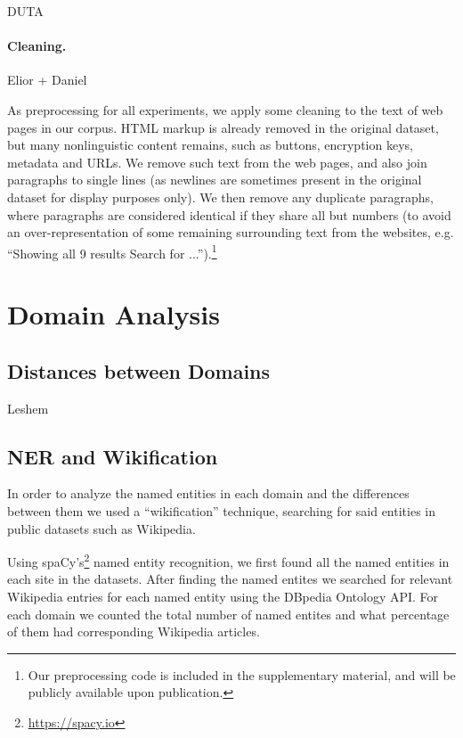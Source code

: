 \documentclass[11pt,a4paper]{article}
\begin{document}
DUTA \citep{AlNabki17}

\paragraph{Cleaning.} Elior + Daniel

As preprocessing for all experiments, we apply some cleaning to the text
of web pages in our corpus.
HTML markup is already removed in the original dataset,
but many nonlinguistic content remains, such as
buttons, encryption keys, metadata and URLs.
We remove such text from the web pages, and also join paragraphs to single lines
(as newlines are sometimes present in the original dataset for display purposes
only).
We then remove any duplicate paragraphs, where paragraphs are considered
identical if they share all but numbers
(to avoid an over-representation of some remaining surrounding text from the
websites, e.g. ``Showing all 9 results Search for
...'').\footnote{Our preprocessing code is included in the supplementary
material, and will be publicly available upon publication.}

\section{Domain Analysis}

\subsection{Distances between Domains}

Leshem



\subsection{NER and Wikification}

In order to analyze the named entities in each domain and the differences
between them we used a ``wikification'' technique, searching for
said entities in public datasets such as Wikipedia. 

Using spaCy's\footnote{\url{https://spacy.io}}
named entity recognition, we first found all the named
entities in each site in the datasets. After finding the named entites
we searched for relevant Wikipedia entries for each named entity using
the DBpedia Ontology API. For each domain we counted the total number
of named entites and what percentage of them had corresponding Wikipedia
articles.
\end{document}
